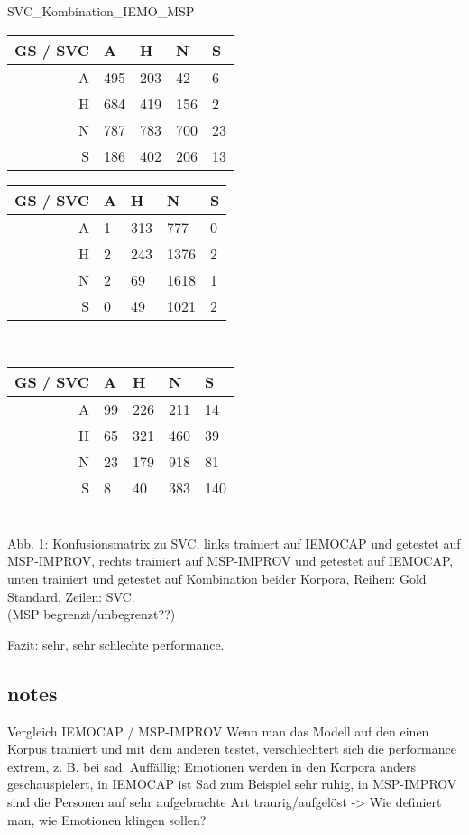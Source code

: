 \documentclass{article} %
\begin{document}
SVC_Kombination_IEMO_MSP \\
\begin{tabular}{|r|llll|}
\hline
GS / SVC & A & H & N & S \\
\hline
A & 495 & 203 & 42 & 6 \\
H & 684 & 419 & 156 & 2 \\
N & 787 & 783 & 700 & 23 \\
S & 186 & 402 & 206 & 13 \\
\hline
\end{tabular}
\begin{tabular}{|r|llll|}
\hline
GS / SVC & A & H & N & S \\
\hline
A & 1 & 313 & 777 & 0 \\
H & 2 & 243 & 1376 & 2 \\
N & 2 & 69 & 1618 & 1 \\
S & 0 & 49 & 1021 & 2 \\
\hline
\end{tabular} \\
\begin{tabular}{|r|llll|}
\hline
GS / SVC & A & H & N & S \\
\hline
A & 99 & 226 & 211 & 14 \\
H & 65 & 321 & 460 & 39 \\
N & 23 & 179 & 918 & 81 \\
S & 8 & 40 & 383 & 140 \\
\hline
\end{tabular} \\

Abb. 1: Konfusionsmatrix zu SVC, links trainiert auf IEMOCAP und getestet auf MSP-IMPROV, rechts trainiert auf MSP-IMPROV und getestet auf IEMOCAP, unten trainiert und getestet auf Kombination beider Korpora, Reihen: Gold Standard, Zeilen: SVC. \\

(MSP begrenzt/unbegrenzt??)

Fazit: sehr, sehr schlechte performance. 

\subsection{notes}

Vergleich IEMOCAP / MSP-IMPROV
Wenn man das Modell auf den einen Korpus trainiert und mit dem anderen testet, verschlechtert sich die performance extrem, z. B. bei sad. Auffällig: Emotionen werden in den Korpora anders geschauspielert, in IEMOCAP ist Sad zum Beispiel sehr ruhig, in MSP-IMPROV sind die Personen auf sehr aufgebrachte Art traurig/aufgelöst
-> Wie definiert man, wie Emotionen klingen sollen?
\end{document}
